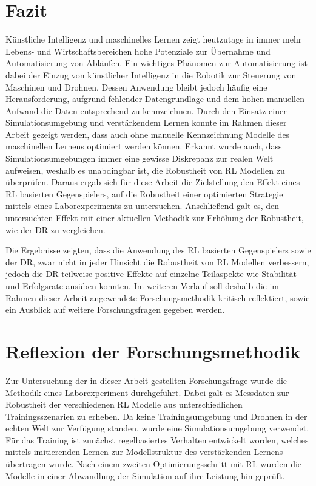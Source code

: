 \section{Fazit}
Künstliche Intelligenz und maschinelles Lernen zeigt heutzutage in immer mehr Lebens- und Wirtschaftsbereichen hohe Potenziale zur Übernahme und Automatisierung von Abläufen.
Ein wichtiges Phänomen zur Automatisierung ist dabei der Einzug von künstlicher Intelligenz in die Robotik zur Steuerung von Maschinen und Drohnen.
Dessen Anwendung bleibt jedoch häufig eine Herausforderung, aufgrund fehlender Datengrundlage und dem hohen manuellen Aufwand die Daten entsprechend zu kennzeichnen. 
Durch den Einsatz einer Simulationsumgebung und verstärkendem Lernen konnte im Rahmen dieser Arbeit gezeigt werden, dass auch ohne manuelle Kennzeichnung Modelle des maschinellen Lernens optimiert werden können.
Erkannt wurde auch, dass Simulationsumgebungen immer eine gewisse Diskrepanz zur realen Welt aufweisen, weshalb es unabdingbar ist, die Robustheit von RL Modellen zu überprüfen.
Daraus ergab sich für diese Arbeit die Zielstellung den Effekt eines RL basierten Gegenspielers, auf die Robustheit einer optimierten Strategie mittels eines Laborexperiments zu untersuchen.
Anschließend galt es, den untersuchten Effekt mit einer aktuellen Methodik zur Erhöhung der Robustheit, wie der DR zu vergleichen.

Die Ergebnisse zeigten, dass die Anwendung des RL basierten Gegenspielers sowie der DR, zwar nicht in jeder Hinsicht die Robustheit von RL Modellen verbessern, jedoch die DR teilweise positive Effekte auf einzelne Teilaspekte wie Stabilität und Erfolgsrate ausüben konnten.
Im weiteren Verlauf soll deshalb die im Rahmen dieser Arbeit angewendete Forschungsmethodik kritisch reflektiert, sowie ein Ausblick auf weitere Forschungsfragen gegeben werden.

\section{Reflexion der Forschungsmethodik}

Zur Untersuchung der in dieser Arbeit gestellten Forschungsfrage wurde die Methodik eines Laborexperiment durchgeführt. 
Dabei galt es Messdaten zur Robustheit der verschiedenen RL Modelle aus unterschiedlichen Trainingsszenarien zu erheben.
Da keine Trainingsumgebung und Drohnen in der echten Welt zur Verfügung standen, wurde eine Simulationsumgebung verwendet. 
Für das Training ist zunächst regelbasiertes Verhalten entwickelt worden, welches mittels imitierenden Lernen zur Modellstruktur des verstärkenden Lernens übertragen wurde.
Nach einem zweiten Optimierungsschritt mit RL wurden die Modelle in einer Abwandlung der Simulation auf ihre Leistung hin geprüft.

